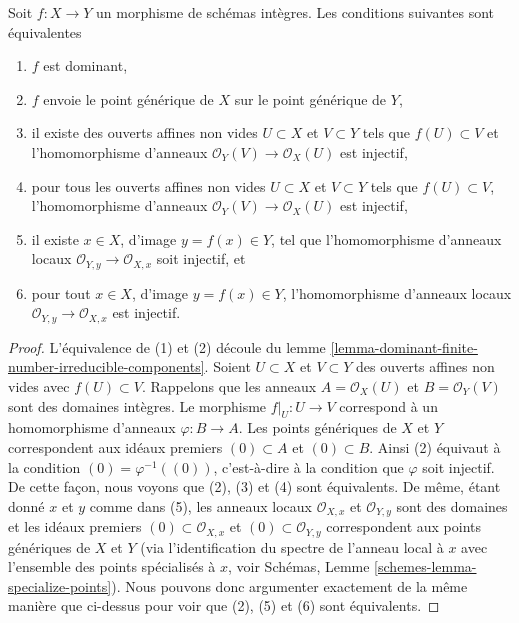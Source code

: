 \begin{lemma}
\label{lemma-dominant-between-integral}
Soit $f : X \to Y$ un morphisme de schémas intègres. Les conditions suivantes sont
équivalentes
\begin{enumerate}
\item $f$ est dominant,
\item $f$ envoie le point générique de $X$ sur le point générique de $Y$,
\item il existe des ouverts affines non vides $U \subset X$ et
$V \subset Y$ tels que $f(U) \subset V$ et l'homomorphisme d'anneaux $\mathcal{O}_Y(V) \to \mathcal{O}_X(U)$ est
injectif,
\item pour tous les ouverts affines non vides $U \subset X$ et
$V \subset Y$ tels que $f(U) \subset V$, l'homomorphisme d'anneaux $\mathcal{O}_Y(V) \to \mathcal{O}_X(U)$ est
injectif,
\item il existe $x \in X$, d'image $y = f(x) \in Y$, tel que l'homomorphisme
d'anneaux locaux $\mathcal{O}_{Y, y} \to \mathcal{O}_{X, x}$ soit injectif, et
\item pour tout $x \in X$, d'image $y = f(x) \in Y$, l'homomorphisme
d'anneaux locaux $\mathcal{O}_{Y, y} \to \mathcal{O}_{X, x}$ est injectif.
\end{enumerate}
\end{lemma}

\begin{proof}
L'équivalence de (1) et (2) découle du lemme
\ref{lemma-dominant-finite-number-irreducible-components}. Soient $U \subset X$ et $V \subset Y$ des ouverts affines
non vides avec $f(U) \subset V$. Rappelons que les anneaux $A = \mathcal{O}_X(U)$
et $B = \mathcal{O}_Y(V)$ sont des domaines intègres. Le morphisme
$f|_U : U \to V$ correspond à un homomorphisme
d'anneaux $\varphi : B \to A$. Les points génériques de $X$
et $Y$ correspondent aux idéaux premiers $(0) \subset A$
et $(0) \subset B$. Ainsi (2) équivaut à la condition $(0) = \varphi^{-1}((0))$,
c'est-à-dire à la condition que $\varphi$ soit injectif.
De cette façon, nous voyons que (2), (3) et
(4) sont équivalents. De même, étant donné $x$
et $y$ comme dans (5), les anneaux locaux
$\mathcal{O}_{X, x}$ et $\mathcal{O}_{Y, y}$ sont des domaines et les idéaux
premiers $(0) \subset \mathcal{O}_{X, x}$ et $(0) \subset \mathcal{O}_{Y, y}$ correspondent
aux points génériques de $X$ et $Y$
(via l'identification du spectre de l'anneau local à
$x$ avec l'ensemble des points
spécialisés à $x$, voir Schémas,
Lemme \ref{schemes-lemma-specialize-points}). Nous pouvons donc argumenter exactement
de la même manière que ci-dessus pour voir
que (2), (5) et (6) sont équivalents.
\end{proof}







